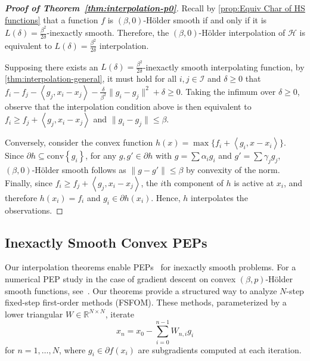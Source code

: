 \documentclass[11pt, hidelinks]{article}
\numberwithin{equation}{section}
\theoremstyle{thmstyletwo}%
\numberwithin{equation}{section}
\newcommand{\conv}[1]{\textrm{conv}\left\{{#1}\right\}}
\newcommand{\Ical}{\mathcal{I}}
\newcommand{\Holder}{H\"older }
\newcommand{\inner}[2]{\left\langle {#1}, {#2} \right\rangle}
\begin{document}
\begin{proof}[{\bf Proof of Theorem~\ref{thm:interpolation-p0}}]

Recall by \cref{prop:Equiv Char of HS functions} that a function $f$ is $(\beta, 0)$-\Holder smooth if and only if it is $L(\delta) = \frac{\beta^2}{2\delta}$-inexactly smooth. Therefore, the $(\beta, 0)$-\Holder interpolation of $\mathcal{H}$ is equivalent to $L(\delta) = \frac{\beta^2}{2\delta}$ interpolation.

Supposing there exists an $L(\delta) = \frac{\beta^2}{2\delta}$-inexactly smooth interpolating function, by \cref{thm:interpolation-general}, it must hold for all $i, j \in \Ical$ and $\delta \geq 0$ that $f_i -f_j - \inner{g_j}{x_i-x_j}-\frac{\delta}{\beta^2}\|g_i-g_j\|^2 +\delta \geq 0.$
Taking the infimum over $\delta \geq 0$, observe that the interpolation condition above is then equivalent to $f_i \geq f_j + \inner{g_j}{x_i-x_j}$ and $\|g_i-g_j\| \leq \beta.$


Conversely, consider the convex function $h(x) = \max \{f_i + \inner{g_i}{x-x_i}\}$. Since $\partial h \subseteq \conv{g_i}$, for any $g, g' \in \partial h$ with $g = \sum \alpha_i g_i$ and $g' = \sum \gamma_j g_j$, $(\beta,0)$-\Holder smooth follows as 
$\|g-g'\| \leq \beta$ by convexity of the norm. Finally, since $f_i \geq f_j + \inner{g_j}{x_i-x_j}$, the $i$th component of $h$ is active at $x_i$, and therefore $h(x_i) = f_i$ and $g_i \in \partial h(x_i)$. Hence, $h$ interpolates the observations. 
\end{proof}








\subsection{Inexactly Smooth Convex PEPs} \label{subsec:PEPs}
Our interpolation theorems enable PEPs~\cite{drori2014performance,taylor2017smooth,taylor2017composite} for inexactly smooth problems. For a numerical PEP study in the case of gradient descent on convex $(\beta,p)$-\Holder smooth functions, see~\cite[Section 4.4]{kamri2025}. Our theorems provide a structured way to analyze $N$-step fixed-step first-order methods (FSFOM). These methods, parameterized by a lower triangular $W\in\mathbb{R}^{N \times N}$, iterate
\begin{equation*}
    x_n = x_0 - \sum_{i=0}^{n-1} W_{n, i} g_i
\end{equation*}
for $n=1,\dots,N$, where $g_i\in\partial f(x_i)$ are subgradients computed at each iteration.%
\end{document}
